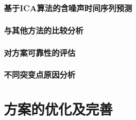 \documentclass[a4paper]{article}
\begin{document}
\section{基于ICA算法的含噪声时间序列预测}
\section{与其他方法的比较分析}
\section{对方案可靠性的评估}
\section{不同突变点原因分析}

\part{方案的优化及完善}
\end{document}
